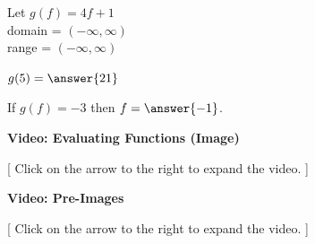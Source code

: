 \documentclass{ximera}
\begin{document}
\begin{question}  


Let $g(f) = 4f+1$ \\
domain = $(-\infty, \infty)$ \\
range = $(-\infty, \infty)$


$g(5) = \answer{21}$

If $g(f) = -3$ then $f = \answer{-1}$.
\end{question}





\begin{explanation} \textbf{\textcolor{red!75!green}{Video: Evaluating Functions (Image)}}

[ Click on the arrow to the right to expand the video. ]
\begin{expandable} 

\begin{center}
\end{center}

\end{expandable}
\end{explanation}






\begin{explanation} \textbf{\textcolor{red!75!green}{Video: Pre-Images}}

[ Click on the arrow to the right to expand the video. ]
\begin{expandable} 

\begin{center}
\end{center}

\end{expandable}
\end{explanation}
\end{document}
